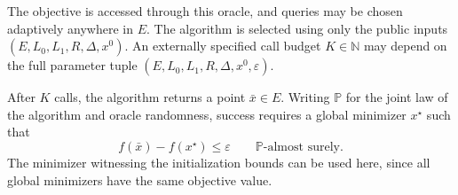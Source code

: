 \documentclass[10pt]{article}
\theoremstyle{definition}
\begin{document}
The objective is accessed through this oracle, and queries may be chosen adaptively anywhere in $E$. The algorithm is selected using only the public inputs $(E,L_0,L_1,R,\Delta,x^0)$. An externally specified call budget $K\in\mathbb{N}$ may depend on the full parameter tuple $(E,L_0,L_1,R,\Delta,x^0,\varepsilon)$.

After $K$ calls, the algorithm returns a point $\bar{x}\in E$. Writing $\mathbb{P}$ for the joint law of the algorithm and oracle randomness, success requires a global minimizer $x^\star$ such that
\[
f(\bar{x})-f(x^\star)\leq\varepsilon
\qquad\mathbb{P}\text{-almost surely}.
\]
The minimizer witnessing the initialization bounds can be used here, since all global minimizers have the same objective value.
\end{document}
